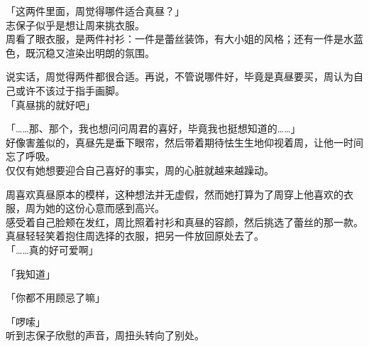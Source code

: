 「这两件里面，周觉得哪件适合真昼？」\\

志保子似乎是想让周来挑衣服。\\

周看了眼衣服，是两件衬衫：一件是蕾丝装饰，有大小姐的风格；还有一件是水蓝色，既沉稳又渲染出明朗的氛围。

说实话，周觉得两件都很合适。再说，不管说哪件好，毕竟是真昼要买，周认为自己或许不该过于指手画脚。\\

「真昼挑的就好吧」

「……那、那个，我也想问问周君的喜好，毕竟我也挺想知道的……」\\

好像害羞似的，真昼先是垂下眼帘，然后带着期待怯生生地仰视着周，让他一时间忘了呼吸。\\

仅仅有她想要迎合自己喜好的事实，周的心脏就越来越躁动。

周喜欢真昼原本的模样，这种想法并无虚假，然而她打算为了周穿上他喜欢的衣服，周为她的这份心意而感到高兴。\\

感受着自己脸颊在发红，周比照着衬衫和真昼的容颜，然后挑选了蕾丝的那一款。\\

真昼轻轻笑着抱住周选择的衣服，把另一件放回原处去了。\\

「……真的好可爱啊」

「我知道」

「你都不用顾忌了嘛」

「啰嗦」\\

听到志保子欣慰的声音，周扭头转向了别处。
